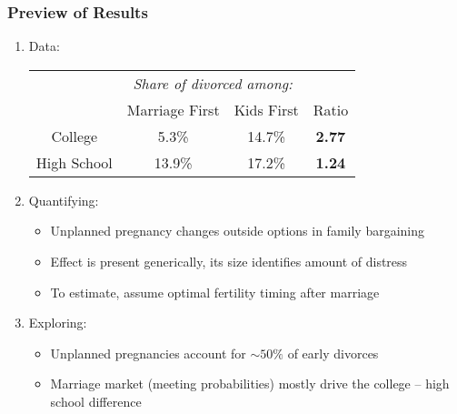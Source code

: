 \documentclass{beamer}
\begin{document}
\begin{frame}[plain]
\frametitle{Preview of Results}

\begin{enumerate}

\item Data: 
{\small
\begin{center}
\begin{tabular}{|c|c|c|c|}\hline
 & \multicolumn{2}{|c|}{\textit{Share of divorced among:}} & \\
& Marriage First & Kids First & Ratio \\\hline
College &  5.3\% &  14.7\% & \textbf{2.77} \\
High School &  13.9\% & 17.2\% &  \textbf{1.24}  \\\hline
\end{tabular}
\end{center}
}

\item Quantifying:
\begin{itemize}
\item Unplanned pregnancy changes outside options in family bargaining
\item Effect is present generically, its size identifies amount of distress
\item To estimate, assume optimal fertility timing after marriage
\end{itemize}

\item Exploring:
\begin{itemize}
\item Unplanned pregnancies account for $\sim50\%$ of early divorces
\item Marriage market (meeting probabilities) mostly drive the college -- high school difference
\end{itemize}

\end{enumerate}
\end{frame}


%
%
\end{document}
